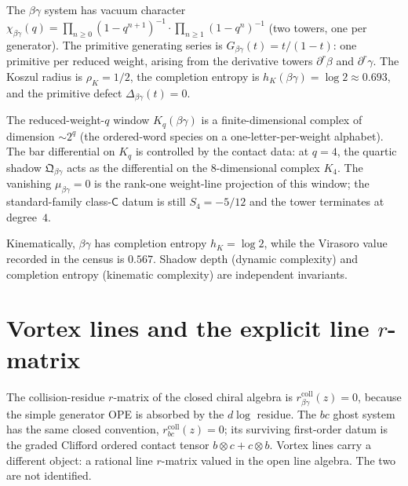 \begin{remark}
\label{rem:betagamma-completion-kinematics}
The $\beta\gamma$ system has vacuum character
$\chi_{\beta\gamma}(q) = \prod_{n \geq 0}(1-q^{n+1})^{-1}
\cdot \prod_{n \geq 1}(1-q^n)^{-1}$
(two towers, one per generator). The primitive generating series is
$G_{\beta\gamma}(t) = t/(1-t)$: one primitive per reduced weight,
arising from the derivative towers $\partial^r\beta$ and
$\partial^r\gamma$. The Koszul radius is $\rho_K = 1/2$, the
completion entropy is $h_K(\beta\gamma) = \log 2 \approx 0.693$,
and the primitive defect $\Delta_{\beta\gamma}(t) = 0$.

The reduced-weight-$q$ window $K_q(\beta\gamma)$ is a
finite-dimensional complex of dimension $\sim 2^q$ (the ordered-word
species on a one-letter-per-weight alphabet). The bar differential
on $K_q$ is controlled by the contact data: at $q = 4$, the quartic
shadow $\mathfrak{Q}_{\beta\gamma}$ acts as the differential on the
$8$-dimensional complex $K_4$. The vanishing
$\mu_{\beta\gamma} = 0$ is the rank-one weight-line projection of
this window; the standard-family class-$\mathsf C$ datum is still
$S_4=-5/12$ and the tower terminates at degree~$4$.

Kinematically, $\beta\gamma$ has completion entropy
$h_K=\log 2$, while the Virasoro value recorded in the census is
$0.567$. Shadow depth (dynamic complexity) and completion entropy
(kinematic complexity) are independent invariants.
\end{remark}


\section{Vortex lines and the explicit line \texorpdfstring{$r$}{r}-matrix}
\label{sec:betagamma-vortex-lines}

The collision-residue $r$-matrix of the closed chiral algebra is
$r^{\mathrm{coll}}_{\beta\gamma}(z)=0$, because the simple generator
OPE is absorbed by the $d\log$ residue. The $bc$ ghost system has the
same closed convention,
$r^{\mathrm{coll}}_{bc}(z)=0$; its surviving first-order datum is the
graded Clifford ordered contact tensor
$b\otimes c+c\otimes b$. Vortex lines carry a different object: a
rational line $r$-matrix valued in the open line algebra. The two are
not identified.

